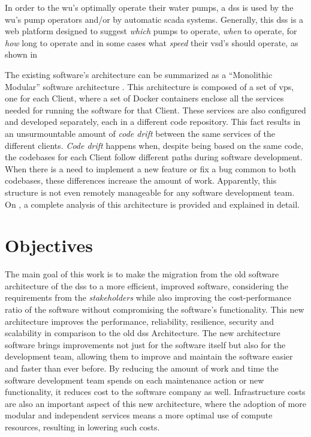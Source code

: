 In order to the \gls{wu}'s optimally operate their water pumps, a \gls{dss} is used by the \gls{wu}'s pump operators and/or by automatic \gls{scada} systems. Generally, this \gls{dss} is a web platform designed to suggest \textit{which} pumps to operate, \textit{when} to operate, for \textit{how} long to operate and in some cases what \textit{speed} their \gls{vsd}'s should operate, as shown in 

The existing software’s architecture can be summarized as a “Monolithic Modular” software architecture \parencite{newman2019monolith}. This architecture is composed of a set of \gls{vps}, one for each Client, where a set of Docker containers enclose all the services needed for running the software for that Client. These services are also configured and developed separately, each in a different code repository. This fact results in an unsurmountable amount of \textit{code drift} between the same services of the different clients. \textit{Code drift} happens when, despite being based on the same code, the codebases for each Client follow different paths during software development. When there is a need to implement a new feature or fix a bug common to both codebases, these differences increase the amount of work. Apparently, this structure is not even remotely manageable for any software development team. On , a complete analysis of this architecture is provided and explained in detail.

\section{Objectives}\label{intro:s:objectives}

The main goal of this work is to make the migration from the old software architecture of the \gls{dss} to a more efficient, improved software, considering the requirements from the \textit{stakeholders} while also improving the cost-performance ratio of the software without compromising the software's functionality.
This new architecture improves the performance, reliability, resilience, security and scalability in comparison to the old \gls{dss} Architecture. The new architecture software brings improvements not just for the software itself but also for the development team, allowing them to improve and maintain the software easier and faster than ever before. By reducing the amount of work and time the software development team spends on each maintenance action or new functionality, it reduces cost to the software company as well. Infrastructure costs are also an important aspect of this new architecture, where the adoption of more modular and independent services means a more optimal use of compute resources, resulting in lowering such costs.

